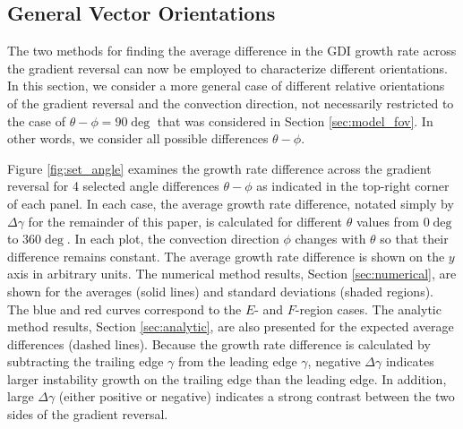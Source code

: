 \subsection{General Vector Orientations}

The two methods for finding the average difference in the GDI growth rate across the gradient reversal can now be employed to characterize different orientations. In this section, we consider a more general case of different relative orientations of the gradient reversal and the convection direction, not necessarily restricted to the case of \(\theta- \phi= 90\deg\) that was considered in Section \ref{sec:model_fov}. In other words, we consider all possible differences \(\theta- \phi\).

Figure \ref{fig:set_angle} examines the growth rate difference across the gradient reversal for 4 selected angle differences \(\theta- \phi\) as indicated in the top-right corner of each panel. In each case, the average growth rate difference, notated simply by \(\Delta\gamma\) for the remainder of this paper, is calculated for different \(\theta\) values from \(0\deg\) to \(360\deg\). In each plot, the convection direction \(\phi\) changes with \(\theta\) so that their difference remains constant. The average growth rate difference is shown on the \(y\) axis in arbitrary units. The numerical method results, Section \ref{sec:numerical}, are shown for the averages (solid lines) and standard deviations (shaded regions). The blue and red curves correspond to the \(E\)- and \(F\)-region cases. The analytic method results, Section \ref{sec:analytic}, are also presented for the expected average differences (dashed lines). Because the growth rate difference is calculated by subtracting the trailing edge \(\gamma\) from the leading edge \(\gamma\), negative \(\Delta\gamma\) indicates larger instability growth on the trailing edge than the leading edge. In addition, large \(\Delta\gamma\) (either positive or negative) indicates a strong contrast between the two sides of the gradient reversal.

